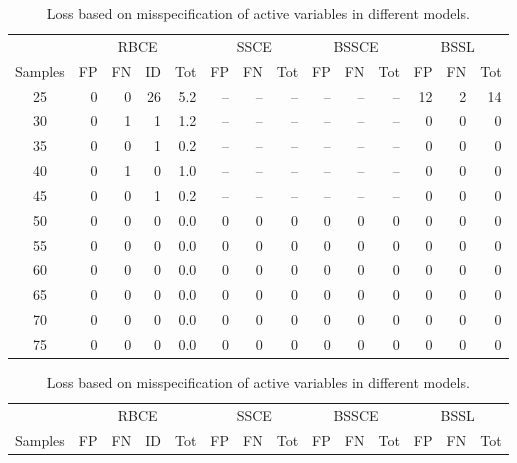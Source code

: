 \documentclass{amsart}
\begin{document}
\begin{table}[ht]
\caption{Loss based on misspecification of active variables in different
models.}\label{tab:misspec}
\centering
{}
\begin{tabular}{|c||rrr|r||rr|r||rr|r||rr|r|}
  \hline
  &\multicolumn{4}{c||}{RBCE}&\multicolumn{3}{c||}{SSCE}
  &\multicolumn{3}{c||}{BSSCE}&\multicolumn{3}{c|}{BSSL}\\
  \cline{2-14}
 Samples & FP & FN & ID & Tot & FP & FN & Tot & FP & FN & Tot & FP & FN & Tot \\ 
  \hline
25 &   0 &   0 &  26 & 5.2 & -- & -- & -- & -- & -- & -- &  12 &   2 & 14\\ 
  30 &   0 &   1 &   1 & 1.2 & -- & -- & -- & -- & -- & -- &   0 &   0 & 0\\ 
  35 &   0 &   0 &   1 & 0.2 & -- & -- & -- & -- & -- & -- &   0 &   0 & 0\\ 
  40 &   0 &   1 &   0 & 1.0 &-- & -- & -- & -- & -- & -- &   0 &   0 & 0\\ 
  45 &   0 &   0 &   1 & 0.2 & -- & -- & -- & -- & -- & -- &   0 &   0 & 0\\ 
  50 &   0 &   0 &   0 & 0.0 &  0 &   0  & 0 &   0 &   0  & 0 &   0 &   0  & 0\\ 
  55 &   0 &   0 &   0 & 0.0 &   0 &   0 &   0  & 0 &   0  & 0 &   0 &   0  & 0\\ 
  60 &   0 &   0 &   0 & 0.0 &   0 &   0 &   0 &   0  & 0  & 0 &   0 &   0  & 0\\ 
  65 &   0 &   0 &   0 & 0.0 &   0 &   0 &   0 &   0 &   0  & 0  & 0 &   0  & 0\\ 
  70 &   0 &   0 &   0 & 0.0 &   0 &   0 &   0 &   0 &   0  & 0  & 0 &   0  & 0\\ 
  75 &   0 &   0 &   0 & 0.0 &   0 &   0 &   0 &   0 &   0  & 0  & 0 &   0  & 0\\ 
   \hline
\end{tabular}
\begin{tabular}{|c||rrr|r||rr|r||rr|r||rr|r|}
  \hline
  &\multicolumn{4}{c||}{RBCE}&\multicolumn{3}{c||}{SSCE}
  &\multicolumn{3}{c||}{BSSCE}&\multicolumn{3}{c|}{BSSL}\\
  \cline{2-14}
 Samples & FP & FN & ID & Tot & FP & FN & Tot & FP & FN & Tot & FP & FN & Tot \\ 
  \hline

\end{tabular}
\end{table}
\end{document}
